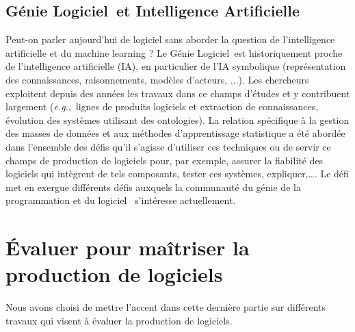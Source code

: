 \documentclass[11pt]{article}
\newcommand{\mynote}[3][black]{\textcolor{#1}{\fbox{\bfseries\sffamily\scriptsize{#2}}
{\small$\blacktriangleright$\textsf{\emph{#3}}$\blacktriangleleft$}}}
\newcommand{\TODO}[1]{\mynote[red]{TODO}{#1}}
\newcommand{\gpl}[0]{génie de la programmation et du logiciel}
\newcommand{\GL}[0]{Génie Logiciel~}
\newcommand{\eg}[0]{\emph{e.g.},~}
\begin{document}




\subsection{\GL et Intelligence Artificielle\label{ss:maintenance:IA}}
Peut-on parler aujourd'hui de logiciel sans aborder la question de l'intelligence artificielle et du machine learning ?
Le \GL est historiquement proche de l'intelligence artificielle (IA), en particulier de l'IA symbolique (représentation des connaissances, raisonnements, modèles d'acteurs, ...). Les chercheurs exploitent depuis des années les travaux dans ce champs d'études et y contribuent largement (\eg lignes de produits logiciels  et extraction de connaissances\cite{Carbonnel2020}, évolution des systèmes utilisant des ontologies\cite{Quinton2020}). La relation spécifique à la gestion des masses de données et aux méthodes d'apprentissage statistique a été abordée dans l'ensemble des défis qu'il s'agisse d'utiliser ces techniques ou de servir ce champs de production de logiciels pour, par exemple, assurer la fiabilité des logiciels qui intègrent de tels composants, tester ces systèmes, expliquer,\ldots. Le défi \cite{IA} met en exergue différents défis auxquels la communauté du \gpl 
~s'intéresse actuellement.

\section{Évaluer pour maîtriser la production de logiciels \label{s:evaluation}}
Nous avons choisi de mettre l'accent dans cette dernière partie sur différents travaux qui visent à évaluer la production de logiciels.
\end{document}
